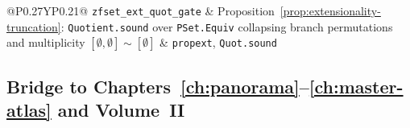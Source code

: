 \begin{table}[htbp]
{\begin{tabularx}{\textwidth}{@{}P{0.27\textwidth}YP{0.21\textwidth}@{}}
\texttt{zfset\_\allowbreak ext\_\allowbreak quot\_\allowbreak gate} & Proposition~\ref{prop:extensionality-truncation}: \texttt{Quotient.sound} over \texttt{PSet.Equiv} collapsing branch permutations and multiplicity $[\emptyset,\emptyset] \sim [\emptyset]$ & \texttt{propext}, \texttt{Quot.sound} \\
\bottomrule
\end{tabularx}\par}
\end{table}

\subsection{\texorpdfstring{Bridge to Chapters~\ref{ch:panorama}--\ref{ch:master-atlas} and Volume~II}{Bridge to Chapters 8--9 and Volume II}}\label{subsec:sets-bridge-ch8}

